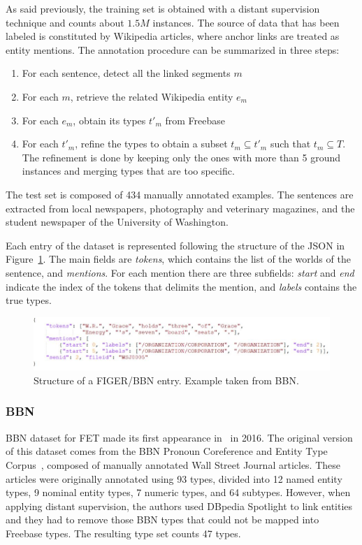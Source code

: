 As said previously, the training set is obtained with a distant supervision technique and counts about $1.5M$ instances. The source of data that has been labeled is constituted by Wikipedia articles, where anchor links are treated as entity mentions. The annotation procedure can be summarized in three steps:
\begin{enumerate}
    \item For each sentence, detect all the linked segments $m$
    \item For each $m$, retrieve the related Wikipedia entity $e_{m}$
    \item For each $e_{m}$, obtain its types $t'_{m}$ from Freebase
    \item For each $t'_{m}$, refine the types to obtain a subset $t_{m} \subseteq t'_{m}$ such that $t_{m} \subseteq T$. The refinement is done by keeping only the ones with more than 5 ground instances and merging types that are too specific.
\end{enumerate}

The test set is composed of 434 manually annotated examples. The sentences are extracted from local newspapers, photography and veterinary magazines, and the student newspaper of the University of Washington.

Each entry of the dataset is represented following the structure of the JSON in Figure~\ref{fig:entry_bbn}. The main fields are \textit{tokens}, which contains the list of the worlds of the sentence, and \textit{mentions}. For each mention there are three subfields: \textit{start} and \textit{end} indicate the index of the tokens that delimits the mention, and \textit{labels} contains the true types.

\begin{figure}
    \centering
    \includegraphics[width=1\linewidth]{figures/entry_bbn.JPG}
    \caption{Structure of a FIGER/BBN entry. Example taken from BBN.}
    \label{fig:entry_bbn}
\end{figure}

\subsubsection{BBN}
BBN dataset for FET made its first appearance in~\cite{ren2016noise} in 2016. The original version of this dataset comes from the BBN Pronoun Coreference and Entity Type Corpus~\cite{bbnCoreference}, composed of manually annotated Wall Street Journal articles. These articles were originally annotated using 93 types, divided into 12 named entity types, 9 nominal entity types, 7 numeric types, and 64 subtypes. However, when applying distant supervision, the authors used DBpedia Spotlight to link entities and they had to remove those BBN types that could not be mapped into Freebase types. The resulting type set counts 47 types.

